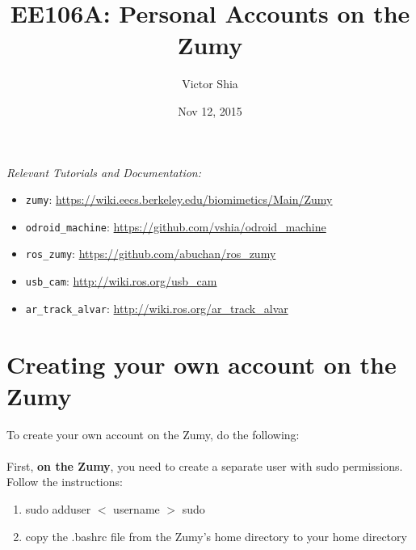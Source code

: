 \documentclass[10pt]{article}
\begin{document}
\title{EE106A: Personal Accounts on the Zumy}
\author{Victor Shia}
\date{Nov 12, 2015}
\maketitle

\emph{Relevant Tutorials and Documentation:} 
\begin{itemize}
\item \verb=zumy=: \url{https://wiki.eecs.berkeley.edu/biomimetics/Main/Zumy}
\item \verb=odroid_machine=: \url{https://github.com/vshia/odroid_machine}
\item \verb=ros_zumy=: \url{https://github.com/abuchan/ros_zumy}
\item \verb=usb_cam=: \url{http://wiki.ros.org/usb_cam}
\item \verb=ar_track_alvar=: \url{http://wiki.ros.org/ar_track_alvar}
\end{itemize}

\tableofcontents


\section{Creating your own account on the Zumy}

To create your own account on the Zumy, do the following: \\ \\
First, \textbf{on the Zumy}, you need to create a separate user with sudo permissions.
Follow the instructions:
\begin{enumerate}
\item sudo adduser $<$ username $>$ sudo
\item copy the .bashrc file from the Zumy's home directory to your home directory
\end{enumerate}
\end{document}
